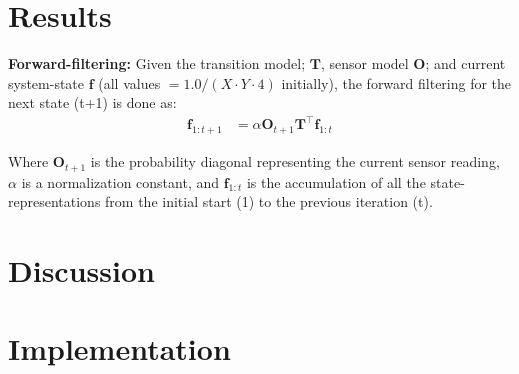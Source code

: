 \documentclass{article}
\newcommand{\mat}[1]{$\textbf{#1}$}
\newcommand{\mmat}[1]{\mathbf{#1}}
\renewcommand{\vec}[1]{$\textbf{#1}$}
\newcommand{\mvec}[1]{\mathbf{#1}}
\begin{document}
  \section*{Results}

    \textbf{Forward-filtering:} Given the transition model; \mat{T}, sensor
    model \mat{O}; and current system-state \vec{f} (all values
    $= 1.0/(X{\cdot}Y{\cdot}4)$ initially), the forward filtering for the next
    state (t+1) is done as:
    \begin{align*}
      \mvec{f}_{1:t+1} &= {\alpha}\mmat{O}_{t+1}\mmat{T}^\top\mvec{f}_{1:t}
    \end{align*}

    Where \mat{O}$_{t+1}$ is the probability diagonal representing the current
    sensor reading, $\alpha$ is a normalization constant, and $\mvec{f}_{1:t}$
    is the accumulation of all the state-representations from the initial start
    (1) to the previous iteration (t).

  \section*{Discussion}
  \section*{Implementation}
\end{document}
